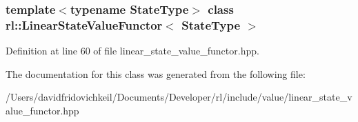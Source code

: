 \subsubsection*{template$<$typename State\+Type$>$\newline
class rl\+::\+Linear\+State\+Value\+Functor$<$ State\+Type $>$}



Definition at line 60 of file linear\+\_\+state\+\_\+value\+\_\+functor.\+hpp.



The documentation for this class was generated from the following file\+:\begin{DoxyCompactItemize}
\item 
/\+Users/davidfridovichkeil/\+Documents/\+Developer/rl/include/value/linear\+\_\+state\+\_\+value\+\_\+functor.\+hpp\end{DoxyCompactItemize}
